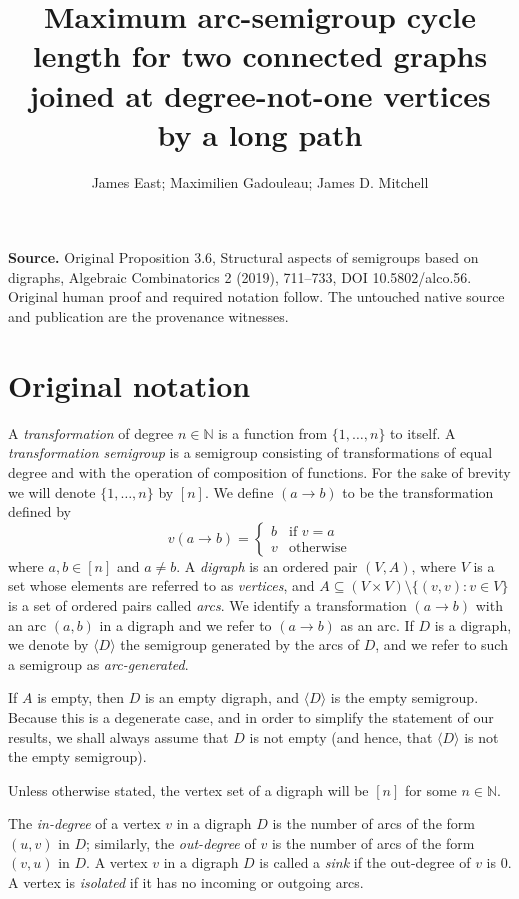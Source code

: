 \documentclass[10pt]{amsart}
\title[Arc-semigroup cycle length]{Maximum arc-semigroup cycle length for two connected graphs joined at degree-not-one vertices by a long path}
\author{James East; Maximilien Gadouleau; James D. Mitchell}
\date{}
\newcommand{\N}{\mathbb{N}}
\newcommand{\genset}[1]{\langle#1\rangle}
\newcommand{\nset}{[n]}
\begin{document}
\maketitle
\noindent\textbf{Source.} Original Proposition 3.6, Structural aspects of semigroups based on digraphs, Algebraic Combinatorics 2 (2019), 711--733, DOI 10.5802/alco.56. Original human proof and required notation follow. The untouched native source and publication are the provenance witnesses.
\section*{Original notation}

A \emph{transformation} of degree $n\in \N$ is a function from $\{1, \ldots,
n\}$ to itself. A \emph{transformation semigroup} is a semigroup consisting
of transformations of equal degree and with the operation of composition of
functions. For the sake of brevity we will denote $\{1,\ldots,n\}$ by $\nset$.
We define $(a \to b)$ to be the transformation defined by
\begin{equation*} 
v (a \to b) = 
 \begin{cases}
 b & \text{if } v = a\\
 v & \text{otherwise}
 \end{cases} 
\end{equation*}
where $a, b \in \nset$ and $a \ne b$. A \emph{digraph} is an ordered pair
$(V, A)$, where $V$ is a set whose elements are referred to as
\emph{vertices}, and $A\subseteq (V\times V) \setminus \{(v,v) : v \in V\}$
is a set of ordered pairs called
\emph{arcs}. We identify a transformation $(a \to b)$ with an arc $(a, b)$
in a digraph and we refer to $(a \to b)$ as an arc. If $D$ is a digraph,
we denote by $\langle D \rangle$ the semigroup generated by
the arcs of $D$, and we refer to such a semigroup as \emph{arc-generated}.

If $A$ is empty, then $D$ is an empty digraph, and $\genset{D}$ is the empty
semigroup. Because this is a degenerate case, and in order to simplify the
statement of our results, we shall always assume that $D$ is not empty (and
hence, that $\genset{D}$ is not the empty semigroup). 

Unless otherwise stated, the vertex set of
a digraph will be $\nset$ for some $n\in \N$. 

The \emph{in-degree} of a vertex $v$ in a digraph $D$ is the number of arcs
of the form $(u, v)$ in $D$; similarly, the \emph{out-degree} of $v$ is the
number of arcs of the form $(v, u)$ in $D$. A vertex $v$ in a digraph $D$ is
called a \emph{sink} if the out-degree of $v$ is $0$. A vertex is
\emph{isolated} if it has no incoming or outgoing arcs. 
\end{document}
